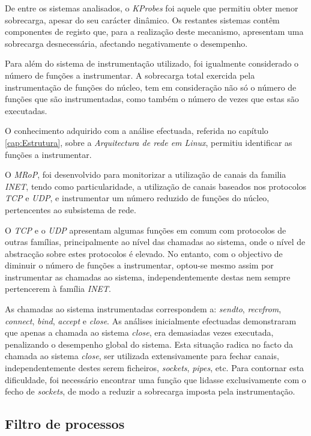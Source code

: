 De entre os sistemas analisados, o \textit{KProbes} foi aquele que permitiu obter menor sobrecarga, apesar do seu carácter dinâmico.
Os restantes sistemas contêm componentes de registo que, para a realização deste mecanismo, apresentam uma sobrecarga desnecessária, afectando negativamente o desempenho.

Para além do sistema de instrumentação utilizado, foi igualmente considerado o número de funções a instrumentar.
A sobrecarga total exercida pela instrumentação de funções do núcleo, tem em consideração não só o número de funções que são instrumentadas, como também o número de vezes que estas são executadas.

O conhecimento adquirido com a análise efectuada, referida no capítulo \ref{cap:Estrutura}, sobre a \textit{Arquitectura de rede em Linux}, permitiu identificar as funções a instrumentar.

O \textit{MRoP}, foi desenvolvido para monitorizar a utilização de canais da familia \textit{INET}, tendo como particularidade, a utilização de canais baseados nos protocolos \textit{TCP} e \textit{UDP}, e instrumentar um número reduzido de funções do núcleo, pertencentes ao subsistema de rede.

O \textit{TCP} e o \textit{UDP} apresentam algumas funções em comum com protocolos de outras famílias, principalmente ao nível das chamadas ao sistema, onde o nível de abstracção sobre estes protocolos é elevado.
No entanto, com o objectivo de diminuir o número de funções a instrumentar, optou-se mesmo assim por instrumentar as chamadas ao sistema, independentemente destas nem sempre pertencerem à família \textit{INET}.

As chamadas ao sistema instrumentadas correspondem a: \textit{sendto}, \textit{recvfrom}, \textit{connect}, \textit{bind}, \textit{accept} e \textit{close}.
As análises inicialmente efectuadas demonstraram que apenas a chamada ao sistema \textit{close}, era demasiadas vezes executada, penalizando o desempenho global do sistema.
Esta situação radica no facto da chamada ao sistema \textit{close}, ser utilizada extensivamente para fechar canais, independentemente destes serem ficheiros, \textit{sockets}, \textit{pipes}, etc.
Para contornar esta dificuldade, foi necessário encontrar uma função que lidasse exclusivamente com o fecho de \textit{sockets}, de modo a reduzir a sobrecarga imposta pela instrumentação.

\subsection{Filtro de processos}

